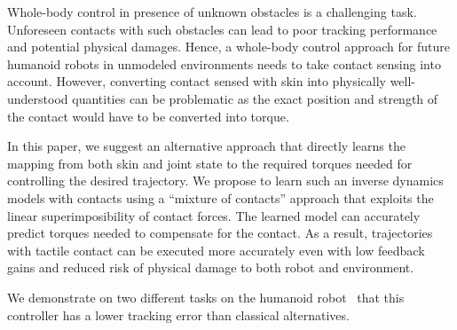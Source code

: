 %
%
%
%
%
%
Whole-body control in presence of unknown obstacles is a challenging task.
%
%
Unforeseen contacts with such obstacles can lead to poor tracking performance and potential physical damages.
Hence, a whole-body control approach for future humanoid robots in unmodeled environments needs to take contact sensing into account. 
However, converting contact sensed with skin into physically well-understood quantities can be problematic as the exact position and strength of the contact would have to be converted into torque. 

%
In this paper, we suggest an alternative approach that directly learns the mapping from both skin and joint state to the required torques needed for controlling the desired trajectory. 
%
%
We propose to learn such an inverse dynamics models with contacts using a ``mixture of contacts'' approach that exploits the linear superimposibility of contact forces. 
The learned model can accurately predict torques needed to compensate for the contact.  
%
%
As a result, trajectories with tactile contact can be executed more accurately even with low feedback gains and reduced risk of physical damage to both robot and environment. 

%
We demonstrate on two different tasks on the humanoid robot~\robot{} that this controller has a lower tracking error than classical alternatives.


%

